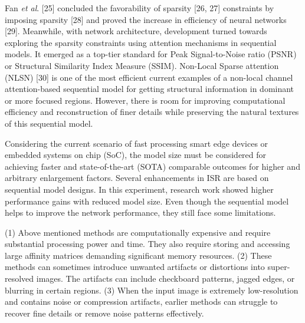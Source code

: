 \documentclass{ieeeaccess}
\begin{document}
Fan \textit{et al}. [25] concluded the favorability of sparsity [26, 27] constraints by imposing sparsity [28] and proved the increase in efficiency of neural networks [29]. Meanwhile, with network architecture, development turned towards exploring the sparsity constraints using attention mechanisms in sequential models. It emerged as a top-tier standard for Peak Signal-to-Noise ratio (PSNR) or Structural Similarity Index Measure (SSIM). Non-Local Sparse attention (NLSN) [30] is one of the most efficient current examples of a non-local channel attention-based sequential model for getting structural information in dominant or more focused regions. However, there is room for improving computational efficiency and reconstruction of finer details while preserving the natural textures of this sequential model. 

Considering the current scenario of fast processing smart edge devices or embedded systems on chip (SoC), the model size must be considered for achieving faster and state-of-the-art (SOTA) comparable outcomes for higher and arbitrary enlargement factors. Several enhancements in ISR are based on sequential model designs. In this experiment, research work showed higher
performance gains with reduced model size. Even though the sequential model helps to improve the network performance, they still face some limitations.

(1) Above mentioned methods are computationally expensive and require substantial processing power and time. They also require storing and accessing large affinity matrices demanding significant memory resources.
(2) These methods can sometimes introduce unwanted artifacts or distortions into super-resolved images. The artifacts can include checkboard patterns, jagged edges, or blurring in certain regions.
(3) When the input image is extremely low-resolution and contains noise or compression artifacts, earlier methods can struggle to recover fine details or remove noise patterns effectively.
\end{document}
